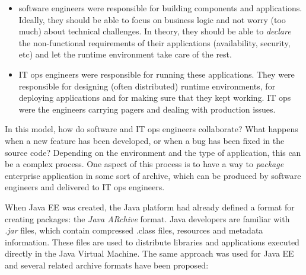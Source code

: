 \begin{itemize}
\item software engineers were responsible for building components and applications. Ideally, they should be able to focus on business logic and not worry (too much) about technical challenges. In theory, they should be able to \emph{declare} the non-functional requirements of their applications (availability, security, etc) and let the runtime environment take care of the rest.
\item IT ops engineers were responsible for running these applications. They were responsible for designing (often distributed) runtime environments, for deploying applications and for making sure that they kept working. IT ops were the engineers carrying pagers and dealing with production issues.
\end{itemize}


In this model, how do software and IT ops engineers collaborate? What happens when a new feature has been developed, or when a bug has been fixed in the source code? Depending on the environment and the type of application, this can be a complex process. One aspect of this process is to have a way to \emph{package} enterprise application in some sort of archive, which can be produced by software engineers and delivered to IT ops engineers. 

When Java EE was created, the Java platform had already defined a format for creating packages: the \emph{Java ARchive} format. Java developers are familiar with \emph{.jar} files, which contain compressed .class files, resources and metadata information. These files are used to distribute libraries and applications executed directly in the Java Virtual Machine. The same approach was used for Java EE and several related archive formats have been proposed:

